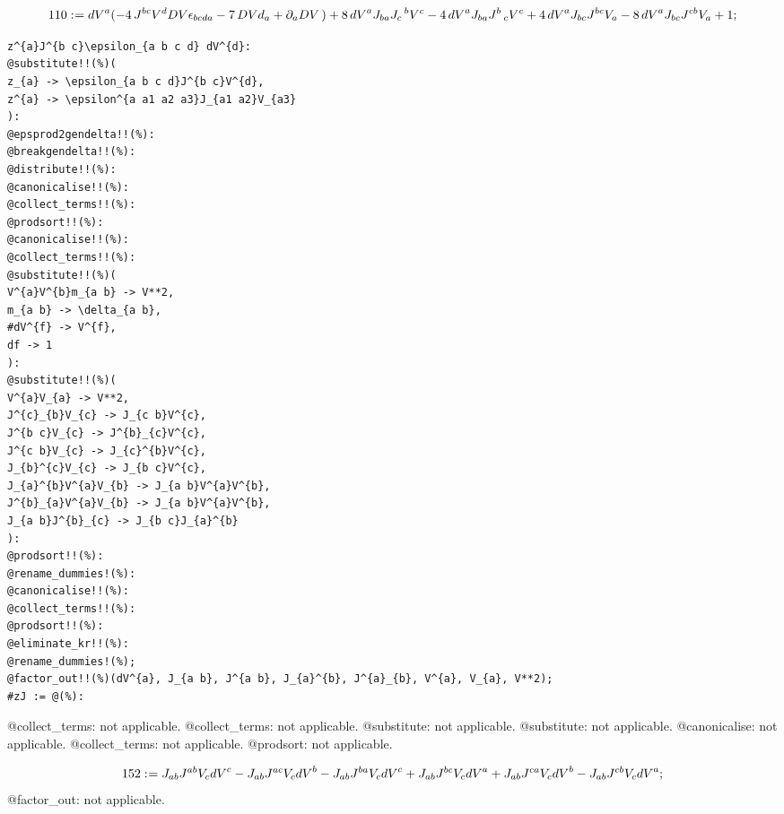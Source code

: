 \documentclass[11pt]{article}
\def\specialcolon{\mathrel{\mathop{:}}\hspace{-.5em}}
\begin{document}
\begin{dmath*}[compact, spread=2pt]
110\specialcolon{}= {dV}^{a} ( - 4\, {J}^{b c} {V}^{d} DV {\epsilon}_{b c d a} - 7\, DV {d}_{a} + {\partial}_{a}{DV}\, ) + 8\, {dV}^{a} {J}_{b a} {J}_{c}\,^{b} {V}^{c} - 4\, {dV}^{a} {J}_{b a} {J}^{b}\,_{c} {V}^{c} + 4\, {dV}^{a} {J}_{b c} {J}^{b c} {V}_{a} - 8\, {dV}^{a} {J}_{b c} {J}^{c b} {V}_{a} + 1;
\end{dmath*}
{\color[named]{Blue}\begin{verbatim}
z^{a}J^{b c}\epsilon_{a b c d} dV^{d}:
@substitute!!(%)(
z_{a} -> \epsilon_{a b c d}J^{b c}V^{d},
z^{a} -> \epsilon^{a a1 a2 a3}J_{a1 a2}V_{a3}
):
@epsprod2gendelta!!(%):
@breakgendelta!!(%):
@distribute!!(%):
@canonicalise!!(%):
@collect_terms!!(%):
@prodsort!!(%):
@canonicalise!!(%):
@collect_terms!!(%):
@substitute!!(%)(
V^{a}V^{b}m_{a b} -> V**2,
m_{a b} -> \delta_{a b},
#dV^{f} -> V^{f},
df -> 1
):
@substitute!!(%)(
V^{a}V_{a} -> V**2,
J^{c}_{b}V_{c} -> J_{c b}V^{c},
J^{b c}V_{c} -> J^{b}_{c}V^{c},
J^{c b}V_{c} -> J_{c}^{b}V^{c},
J_{b}^{c}V_{c} -> J_{b c}V^{c},
J_{a}^{b}V^{a}V_{b} -> J_{a b}V^{a}V^{b},
J^{b}_{a}V^{a}V_{b} -> J_{a b}V^{a}V^{b},
J_{a b}J^{b}_{c} -> J_{b c}J_{a}^{b}
):
@prodsort!!(%):
@rename_dummies!(%):
@canonicalise!!(%):
@collect_terms!!(%):
@prodsort!!(%):
@eliminate_kr!!(%):
@rename_dummies!(%);
@factor_out!!(%)(dV^{a}, J_{a b}, J^{a b}, J_{a}^{b}, J^{a}_{b}, V^{a}, V_{a}, V**2);
#zJ := @(%):
\end{verbatim}}
@collect\_terms: not applicable.
@collect\_terms: not applicable.
@substitute: not applicable.
@substitute: not applicable.
@canonicalise: not applicable.
@collect\_terms: not applicable.
@prodsort: not applicable.








\begin{dmath*}[compact, spread=2pt]
152\specialcolon{}= {J}_{a b} {J}^{a b} {V}_{c} {dV}^{c} - {J}_{a b} {J}^{a c} {V}_{c} {dV}^{b} - {J}_{a b} {J}^{b a} {V}_{c} {dV}^{c} + {J}_{a b} {J}^{b c} {V}_{c} {dV}^{a} + {J}_{a b} {J}^{c a} {V}_{c} {dV}^{b} - {J}_{a b} {J}^{c b} {V}_{c} {dV}^{a};
\end{dmath*}
@factor\_out: not applicable.
\end{document}
